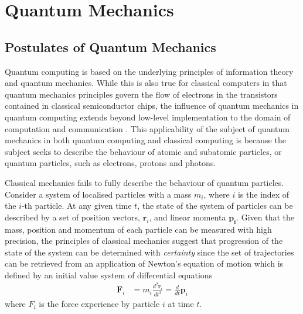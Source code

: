 \section{Quantum Mechanics \label{sec:q_mechanics}}

\subsection{Postulates of Quantum Mechanics \label{subsec:uncertain_quant_dual}}

Quantum computing is based on the underlying principles of information theory and quantum mechanics. While this is also true for classical computers in that quantum mechanics principles govern the flow of electrons in the transistors contained in classical semiconductor chips, the influence of quantum mechanics in quantum computing extends beyond low-level implementation to the domain of computation and communication \cite{Rieffel2011}. This applicability of the subject of quantum mechanics in both quantum computing and classical computing is because the subject seeks to describe the behaviour of atomic and subatomic particles, or quantum particles, such as electrons, protons and photons. 

Classical mechanics fails to fully describe the behaviour of quantum particles. Consider a system of localised particles with a mass $m_i$, where $i$ is the index of the $i$-th particle. At any given time $t$, the state of the system of particles can be described by a set of position vectors, $\mathbf{r}_i$, and linear momenta $\mathbf{p_i}$. Given that the mass, position and momentum of each particle can be measured with high precision, the principles of classical mechanics suggest that progression of the state of the system can be determined with \textit{certainty} since the set of trajectories can be retrieved from an application of Newton's equation of motion which is defined by an initial value system of differential equations 
\begin{align}
	\mathbf{F}_i	& = m_i \frac{d^2 \mathbf{r}_i}{dt^2} = \frac{d}{dt} \mathbf{p}_i
\end{align}
where $F_i$ is the force experience by particle $i$ at time $t$. 

